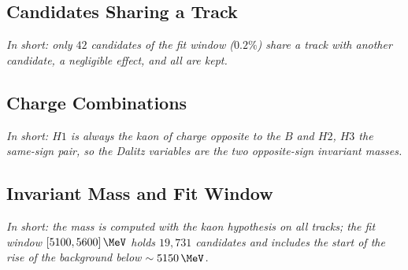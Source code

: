 \begin{table}[h]
\centering
{}
\caption{Number of candidates passing each requirement alone and after the cumulative selection, in the order of the table, and by magnet polarity. The kaon-identification requirement on the three tracks is by far the most selective.}
\label{tab:cutflow}
\end{table}

\subsection{Candidates Sharing a Track}
\emph{In short: only $42$ candidates of the fit window ($0.2\%$) share a track with another candidate, a negligible effect, and all are kept.}

\subsection{Charge Combinations}
\emph{In short: $H1$ is always the kaon of charge opposite to the $B$ and $H2$, $H3$ the same-sign pair, so the Dalitz variables are the two opposite-sign invariant masses.}

\subsection{Invariant Mass and Fit Window}
\emph{In short: the mass is computed with the kaon hypothesis on all tracks; the fit window $[5100,5600]\,\MeV$ holds $19{,}731$ candidates and includes the start of the rise of the background below $\sim5150\,\MeV$.}

